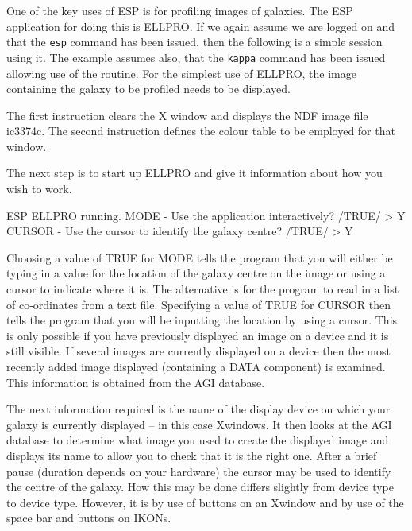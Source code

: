 \documentclass[twoside,11pt]{starlink}
\begin{document}
One of the key uses of ESP is for profiling images of galaxies.
The ESP application for doing this is ELLPRO. If we again assume we
are logged on and that the \texttt{esp} command has been issued,
then the following is a simple session using it. The example
assumes also, that the \texttt{kappa} command has been issued allowing use of the
 routine. For the simplest use of ELLPRO, the image containing
the galaxy to be profiled needs to be displayed.

\begin{terminalv}
\end{terminalv}

The first instruction clears the X window and displays the NDF image file
ic3374c. The second instruction defines
the colour table to be employed for that window.

The next step is to start up ELLPRO and give it information about how
you wish to work.

\begin{terminalv}

ESP ELLPRO running.
MODE - Use the application interactively? /TRUE/ > Y
CURSOR - Use the cursor to identify the galaxy centre? /TRUE/ > Y
\end{terminalv}

Choosing a value of TRUE for MODE tells the program that you will
either be typing in a value for the location of the galaxy centre on the image
or using a cursor to indicate where it is. The alternative is for the program to
read in a list of co-ordinates from a text file. Specifying a value of TRUE
for CURSOR then tells the program that you will be inputting the location by
using a cursor. This is only possible if you have previously displayed an
image on a device and it is still visible. If several images are currently
displayed on a device then the most recently added image displayed
(containing a DATA component) is examined. This information is obtained from
the AGI database.

The next information required is the
name of the display device on which your galaxy is currently displayed --
in this case Xwindows. It then looks at the AGI database to determine
what image you used to create the displayed image and displays its name
to allow you to check that it is the right one. After a brief pause
(duration depends on your hardware) the cursor may be used to identify the
centre of the galaxy. How this may be done differs slightly from device type to
device type. However, it is by use of buttons on an Xwindow and by use
of the space bar and buttons on IKONs.
\end{document}
